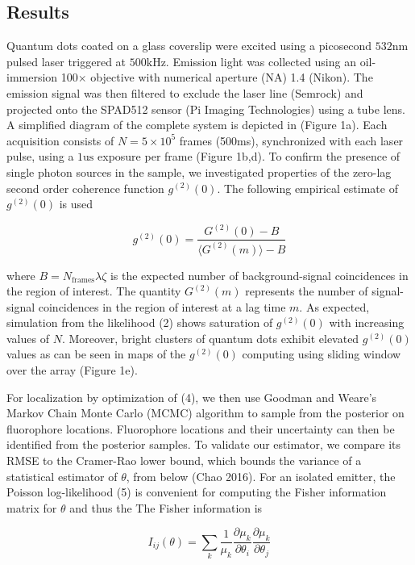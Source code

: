 \documentclass[a4paper, twocolumn, superscriptaddress,prl]{revtex4}  %
\begin{document}
\subsection{Results}

Quantum dots coated on a glass coverslip were excited using a picosecond $532\mathrm{nm}$ pulsed laser triggered at $500\mathrm{kHz}$. Emission light was collected using an oil-immersion 100$\times$ objective with numerical aperture (NA) 1.4 (Nikon). The emission signal was then filtered to exclude the laser line (Semrock) and projected onto the SPAD512 sensor (Pi Imaging Technologies) using a tube lens. A simplified diagram of the complete system is depicted in (Figure 1a). Each acquisition consists of $N=5\times 10^{5}$ frames (500ms), synchronized with each laser pulse, using a $1\mathrm{us}$ exposure per frame (Figure 1b,d). To confirm the presence of single photon sources in the sample, we investigated properties of the zero-lag second order coherence function $g^{(2)}(0)$. The following empirical estimate of $g^{(2)}(0)$ is used \citep{Israel2017}

\begin{equation}
g^{(2)}(0) = \frac{G^{(2)}(0)-B}{\langle G^{(2)}(m)\rangle -B}
\end{equation}

where $B = N_{\mathrm{frames}}\lambda\zeta$ is the expected number of background-signal coincidences in the region of interest. The quantity $G^{(2)}(m)$ represents the number of signal-signal coincidences in the region of interest at a lag time $m$. As expected, simulation from the likelihood (2) shows saturation of $g^{(2)}(0)$  with increasing values of $N$. Moreover, bright clusters of quantum dots exhibit elevated $g^{(2)}(0)$ values as can be seen in maps of the $g^{(2)}(0)$ computing using sliding window over the array (Figure 1e).

For localization by optimization of (4), we then use Goodman and Weare's Markov Chain Monte Carlo (MCMC) algorithm to sample from the posterior on fluorophore locations. Fluorophore locations and their uncertainty can then be identified from the posterior samples. To validate our estimator, we compare its RMSE to the Cramer-Rao lower bound, which bounds the variance of a statistical estimator of $\theta$, from below (Chao 2016). For an isolated emitter, the Poisson log-likelihood (5) is convenient for computing the Fisher information matrix for $\theta$ and thus the The Fisher information is \citep{Smith2010}

\begin{equation}
I_{ij}(\theta) = \sum_{k}\frac{1}{\mu_{k}}\frac{\partial \mu_{k}}{\partial\theta_{i}}\frac{\partial \mu_{k}}{\partial\theta_{j}}
\end{equation}
\end{document}
